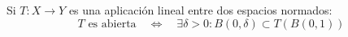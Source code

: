 \begin{ejercicio}
    Si $T:X\to Y$ es una aplicación lineal entre dos espacios normados:
    \begin{equation*}
        T \text{\ es abierta} \quad \Longleftrightarrow \quad  \exists \delta>0 : B(0,\delta)\subset T(B(0,1))
    \end{equation*}
\end{ejercicio}

